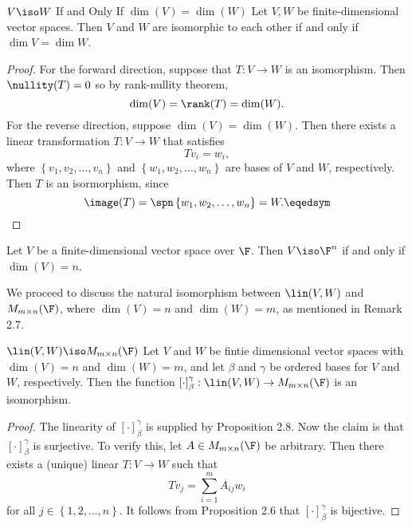 \documentclass[linearalgebraI]{subfiles}
\begin{document}
    \begin{prop}{$V\iso W$ If and Only If $\dim(V)=\dim(W)$}
        Let $V, W$ be finite-dimensional vector spaces. Then $V$ and $W$ are isomorphic to each other if and only if $\dim V = \dim W$.
    \end{prop}

    \begin{proof}
        For the forward direction, suppose that $T: V\to W$ is an isomorphism. Then $\nullity(T) = 0$ so by rank-nullity theorem,
        \begin{equation*}
            \dim(V)=\rank(T)=\dim(W).
        \end{equation*}
        For the reverse direction, suppose $\dim(V) = \dim(W)$. Then there exists a linear transformation $T: V\to W$ that satisfies
        \begin{equation*}
            Tv_i = w_i,
        \end{equation*}
        where $\left\lbrace v_1, v_2, \ldots, v_n \right\rbrace$ and $\left\lbrace w_1, w_2, \ldots, w_n \right\rbrace$ are bases of $V$ and $W$, respectively. Then $T$ is an isormorphism, since
        \begin{equation*}
            \image(T) = \spn \left\lbrace w_1, w_2, \ldots, w_n \right\rbrace = W. \eqedsym
        \end{equation*}
    \end{proof}

    \begin{cor}{}
        Let $V$ be a finite-dimensional vector space over $\F$. Then $V\iso\F^n$ if and only if $\dim(V)=n$.
    \end{cor}	

    \begin{remark}
        We proceed to discuss the natural isomorphism between $\lin(V,W)$ and $M_{m\times n}(\F)$, where $\dim(V)=n$ and $\dim(W)=m$, as mentioned in Remark 2.7.
    \end{remark}

    \begin{theorem}{$\lin(V,W)\iso M_{m\times n}(\F)$}
        Let $V$ and $W$ be fintie dimensional vector spaces with $\dim(V) = n$ and $\dim(W) = m$, and let $\beta$ and $\gamma$ be ordered bases for $V$ and $W$, respectively. Then the function $\left[ \cdot \right] ^\gamma_\beta:\lin(V,W)\to M_{m\times n}(\F)$ is an isomorphism.
    \end{theorem}

    \begin{proof}
        The linearity of $\left[ \cdot \right] ^\gamma_\beta$ is supplied by Proposition 2.8. Now the claim is that $\left[ \cdot \right] ^\gamma_\beta$ is surjective. To verify this, let $A\in M_{m\times n}(\F)$ be arbitrary. Then there exists a (unique) linear $T:V\to W$ such that
        \begin{equation*}
            Tv_j = \sum^{m}_{i=1} A_{ij}w_i
        \end{equation*}
        for all $j\in\left\lbrace 1,2,\ldots,n \right\rbrace$. It follows from Proposition 2.6 that $\left[ \cdot \right] ^\gamma_\beta$ is bijective.
    \end{proof}
\end{document}
